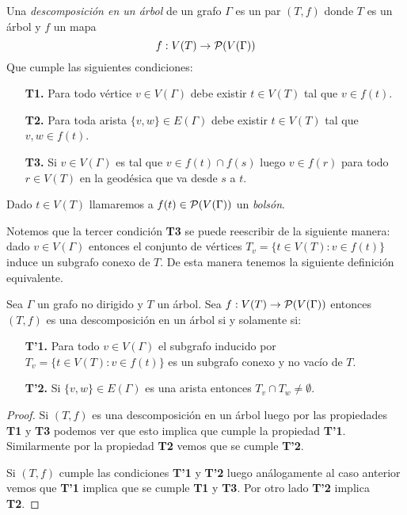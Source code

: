 \documentclass[tesis.tex]{subfiles}
\begin{document}
\begin{deff}\label{desc-arbol}
	Una \emph{descomposición en un árbol} de un grafo $\Gamma$ es un par $(T,f)$ donde
	$T$ es un árbol y $f$ un mapa 
	\[
	f: V(T) \to {\cal{P}}(V(\Gamma))
	\]
	Que cumple las siguientes condiciones:
	\begin{enumerate}
		\item[\textbf{T1.}] Para todo vértice $v \in V(\Gamma)$ debe existir $t \in V(T)$ tal que $v \in f(t)$. 
		\item[\textbf{T2.}] Para toda arista $\{v,w\} \in E(\Gamma)$ 
		debe existir $t \in V(T)$ tal que $v,w \in f(t)$.
		\item[\textbf{T3.}] Si $v \in V(\Gamma)$ es tal que $v \in f(t) \cap f(s)$ luego $v \in f(r)$ para todo $r \in V(T)$ en la geodésica que va desde $s$ a $t$.  
	\end{enumerate}
	Dado $t \in V(T)$ llamaremos a $f(t) \in {\cal{P}}(V(\Gamma))$ un \emph{bolsón}.
	 
\end{deff}
Notemos que la tercer condición \textbf{T3} se puede reescribir de la siguiente manera:
dado $v \in V(\Gamma)$ entonces el conjunto de vértices 
$T_{v} = \{ t \in V(T) :  v \in f(t) \}$ induce un subgrafo conexo de $T$.
\smallskip
De esta manera tenemos la siguiente definición equivalente.


\begin{prop}
	Sea $\Gamma$ un grafo no dirigido y $T$ un árbol.
	Sea $f:V(T) \to {\cal{P}}(V(\Gamma))$ entonces $(T,f)$ es una descomposición en un árbol si y solamente si:
	\begin{enumerate}
		\item[\textbf{T'1.}] Para todo $v \in V(\Gamma)$ el subgrafo inducido por 
		$T_{v} = \{ t \in V(T) :  v \in f(t) \}$ es un subgrafo conexo y no vacío de $T$.
		\item[\textbf{T'2.}] Si $\{ v,w \} \in E(\Gamma)$ es una arista entonces $T_{v} \cap T_{w} \neq \emptyset$.
	\end{enumerate} 
\end{prop}
\begin{proof}
	Si $(T,f)$ es una descomposición en un árbol luego por las propiedades \textbf{T1} y \textbf{T3} podemos ver que esto implica que cumple la propiedad \textbf{T'1}.
	Similarmente por la propiedad \textbf{T2} vemos que se cumple \textbf{T'2}.

	Si $(T,f)$ cumple las condiciones \textbf{T'1} y \textbf{T'2} luego análogamente al caso anterior vemos que \textbf{T'1} implica que se cumple \textbf{T1} y \textbf{T3}.
	Por otro lado \textbf{T'2} implica \textbf{T2}.
\end{proof}
\end{document}
